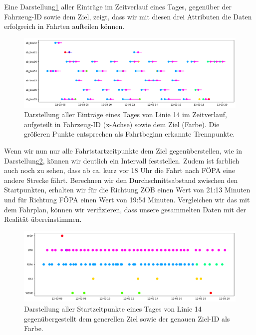 \documentclass[a4paper]{article}
\begin{document}
    Eine Darstellung\ref{fig:analyse} aller Einträge im Zeitverlauf eines Tages, gegenüber der Fahrzeug-ID sowie dem
    Ziel, zeigt, dass wir mit diesen drei Attributen die Daten erfolgreich in Fahrten aufteilen können.

    \begin{figure}[h]
        \includegraphics[scale=0.5]{figures/fig2_analyse}
        \centering
        \caption{Darstellung aller Einträge eines Tages von Linie 14 im Zeitverlauf, aufgeteilt in Fahrzeug-ID (x-Achse)
            sowie dem Ziel (Farbe). Die größeren Punkte entsprechen als Fahrtbeginn erkannte Trennpunkte.}
        \label{fig:analyse}
    \end{figure}


    Wenn wir nun nur alle Fahrtstartzeitpunkte dem Ziel gegenüberstellen, wie in Darstellung\ref{fig:analyse_intervall},
    können wir deutlich ein Intervall feststellen. Zudem ist farblich auch noch zu sehen, dass ab ca. kurz vor 18 Uhr
    die Fahrt nach FÖPA eine andere Strecke fährt. Berechnen wir den Durchschnittsabstand zwischen den Startpunkten,
    erhalten wir für die Richtung ZOB einen Wert von 21:13 Minuten und für Richtung FÖPA einen Wert von 19:54 Minuten.
    Vergleichen wir das mit dem Fahrplan, können wir verifizieren, dass unsere gesammelten Daten mit der Realität
    übereinstimmen.

    \begin{figure}[h]
        \includegraphics[scale=0.5]{figures/fig3_analyse_intervall}
        \centering
        \caption{Darstellung aller Startzeitpunkte eines Tages von Linie 14 gegenübergestellt dem generellen Ziel sowie
        der genauen Ziel-ID als Farbe.}
        \label{fig:analyse_intervall}
    \end{figure}
\end{document}

